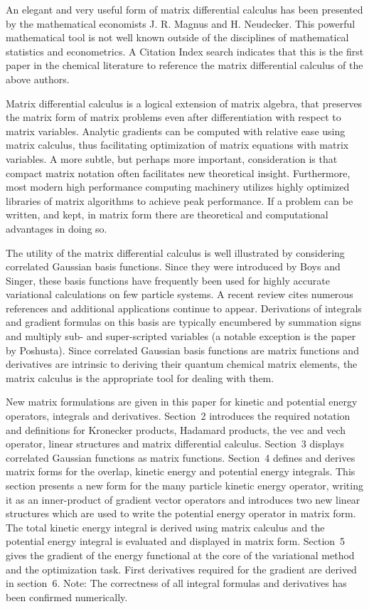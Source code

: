 \documentclass[12pt,thmsa,suthesis,verbatim]{report}
\begin{document}
An elegant and very useful form of matrix differential calculus has been
presented by the mathematical economists J. R. Magnus and H. Neudecker\cite
{MagNeud88}. This powerful mathematical tool is not well known outside of
the disciplines of mathematical statistics and econometrics. A Citation
Index search indicates that this is the first paper in the chemical
literature to reference the matrix differential calculus of the above
authors.

Matrix differential calculus is a logical extension of matrix algebra, that
preserves the matrix form of matrix problems even after differentiation with
respect to matrix variables. Analytic gradients can be computed with
relative ease using matrix calculus, thus facilitating optimization of
matrix equations with matrix variables. A more subtle, but perhaps more
important, consideration is that compact matrix notation often facilitates
new theoretical insight. Furthermore, most modern high performance computing
machinery utilizes highly optimized libraries of matrix algorithms to
achieve peak performance. If a problem can be written, and kept, in matrix
form there are theoretical and computational advantages in doing so.

The utility of the matrix differential calculus is well illustrated by
considering correlated Gaussian basis functions. Since they were introduced
by Boys\cite{Boys} and Singer\cite{Singer1}, these basis functions have
frequently been used for highly accurate variational calculations on few
particle systems. A recent review cites numerous references\cite{Kozlowski93}
and additional applications continue to appear\cite{Kinghorn93,Zhang94}.
Derivations of integrals and gradient formulas on this basis are typically
encumbered by summation signs and multiply sub- and super-scripted variables
(a notable exception is the paper by Poshusta\cite{Poshusta78}). Since
correlated Gaussian basis functions are matrix functions and derivatives are
intrinsic to deriving their quantum chemical matrix elements, the matrix
calculus is the appropriate tool for dealing with them.

New matrix formulations are given in this paper for kinetic and potential
energy operators, integrals and derivatives. Section~2 introduces the
required notation and definitions for Kronecker products, Hadamard products,
the vec and vech operator, linear structures and matrix differential
calculus. Section~3 displays correlated Gaussian functions as matrix
functions. Section~4 defines and derives matrix forms for the overlap,
kinetic energy and potential energy integrals. This section presents a new
form for the many particle kinetic energy operator, writing it as an
inner-product of gradient vector operators and introduces two new linear
structures which are used to write the potential energy operator in matrix
form. The total kinetic energy integral is derived using matrix calculus and
the potential energy integral is evaluated and displayed in matrix form.
Section~5 gives the gradient of the energy functional at the core of the
variational method and the optimization task. First derivatives required for
the gradient are derived in section~6. Note: The correctness of all integral
formulas and derivatives has been confirmed numerically.
\end{document}
